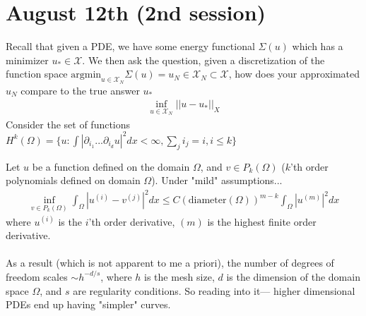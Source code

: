 \section{August 12th (2nd session)}
Recall that given a PDE, we have some energy functional $\Sigma(u)$ which has a minimizer $u_* \in \mathcal X$. We then ask the question, given a discretization of the function space $\text{argmin}_{u \in \mathcal X_N} \Sigma(u) = u_N \in \mathcal X_N \subset \mathcal X$, how does your approximated $u_N$ compare to the true answer $u_*$
\begin{align}
	\inf_{u \in \mathcal X_N}||u-u_*||_X
\end{align}
Consider the set of functions $H^k(\Omega) = \{u : \int |\partial_{i_1} ... \partial_{i_d} u|^2 d x < \infty, \sum_j i_j = i, i \leq k\}$

\begin{theorem}
	 Let $u$ be a function defined on the domain $\Omega$, and $v \in P_k(\Omega)$ ($k$'th order polynomials defined on domain $\Omega$). Under "mild" assumptions...
	\begin{align}
		\inf_{v \in P_k(\Omega)} \int_\Omega |u^{(i)} - v^{(j)}|^2 dx \leq C (\text{diameter}(\Omega))^{m-k} \int_\Omega |u^{(m)}|^2 dx
	\end{align}
	where $u^{(i)}$ is the $i$'th order derivative, $(m)$ is the highest finite order derivative.\\
	\\
	As a result (which is not apparent to me a priori), the number of degrees of freedom scales $\sim h^{-d/s}$, where $h$ is the mesh size, $d$ is the dimension of the domain space $\Omega$, and $s$ are regularity conditions. So reading into it--- higher dimensional PDEs end up having "simpler" curves.
\end{theorem}

